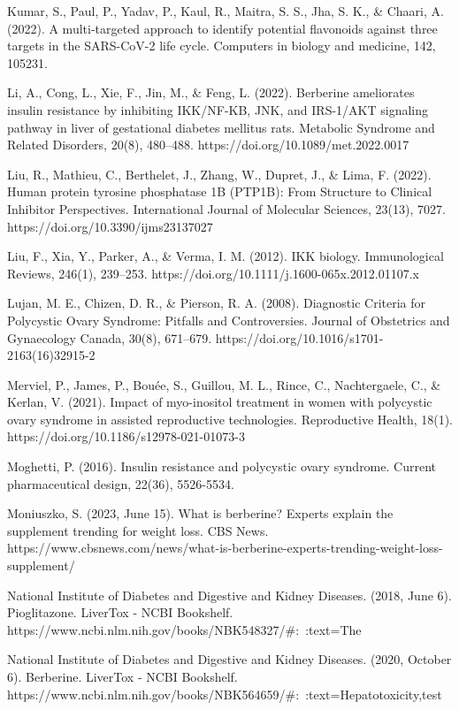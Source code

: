 Kumar, S., Paul, P., Yadav, P., Kaul, R., Maitra, S. S., Jha, S. K., & Chaari, A. (2022). A multi-targeted approach to identify potential flavonoids against three targets in the SARS-CoV-2 life cycle. Computers in biology and medicine, 142, 105231.

Li, A., Cong, L., Xie, F., Jin, M., & Feng, L. (2022). Berberine ameliorates insulin resistance by inhibiting IKK/NF-ΚB, JNK, and IRS-1/AKT signaling pathway in liver of gestational diabetes mellitus rats. Metabolic Syndrome and Related Disorders, 20(8), 480–488. https://doi.org/10.1089/met.2022.0017

Liu, R., Mathieu, C., Berthelet, J., Zhang, W., Dupret, J., & Lima, F. (2022). Human protein tyrosine phosphatase 1B (PTP1B): From Structure to Clinical Inhibitor Perspectives. International Journal of Molecular Sciences, 23(13), 7027. https://doi.org/10.3390/ijms23137027

Liu, F., Xia, Y., Parker, A., & Verma, I. M. (2012). IKK biology. Immunological Reviews, 246(1), 239–253. https://doi.org/10.1111/j.1600-065x.2012.01107.x

Lujan, M. E., Chizen, D. R., & Pierson, R. A. (2008). Diagnostic Criteria for Polycystic Ovary Syndrome: Pitfalls and Controversies. Journal of Obstetrics and Gynaecology Canada, 30(8), 671–679. https://doi.org/10.1016/s1701-2163(16)32915-2

Merviel, P., James, P., Bouée, S., Guillou, M. L., Rince, C., Nachtergaele, C., & Kerlan, V. (2021). Impact of myo-inositol treatment in women with polycystic ovary syndrome in assisted reproductive technologies. Reproductive Health, 18(1). https://doi.org/10.1186/s12978-021-01073-3

Moghetti, P. (2016). Insulin resistance and polycystic ovary syndrome. Current pharmaceutical design, 22(36), 5526-5534.

Moniuszko, S. (2023, June 15). What is berberine? Experts explain the supplement trending for weight loss. CBS News. https://www.cbsnews.com/news/what-is-berberine-experts-trending-weight-loss-supplement/

National Institute of Diabetes and Digestive and Kidney Diseases. (2018, June 6). Pioglitazone. LiverTox - NCBI Bookshelf. https://www.ncbi.nlm.nih.gov/books/NBK548327/#:~:text=The%

National Institute of Diabetes and Digestive and Kidney Diseases. (2020, October 6). Berberine. LiverTox - NCBI Bookshelf. https://www.ncbi.nlm.nih.gov/books/NBK564659/#:~:text=Hepatotoxicity,test%

